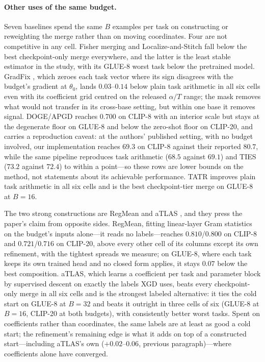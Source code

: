 \documentclass{article} %
\newcommand{\thetab}{\theta_0}
\begin{document}
\paragraph{Other uses of the same budget.}
Seven baselines spend the same $B$ examples per task on constructing or reweighting the merge rather than on moving coordinates. Four are not competitive in any cell. Fisher merging and Localize-and-Stitch fall below the best checkpoint-only merge everywhere, and the latter is the least stable estimator in the study, with its GLUE-8 worst task below the pretrained model. GradFix \citep{rinaldi2025gradfix}, which zeroes each task vector where its sign disagrees with the budget's gradient at $\thetab$, lands $0.03$--$0.14$ below plain task arithmetic in all six cells even with its coefficient grid centred on the released $\alpha/T$ range; the mask removes what would not transfer in its cross-base setting, but within one base it removes signal. DOGE/APGD \citep{wei2025apgd} reaches $0.700$ on CLIP-8 with an interior scale but stays at the degenerate floor on GLUE-8 and below the zero-shot floor on CLIP-20, and carries a reproduction caveat: at the authors' published setting, with no budget involved, our implementation reaches $69.3$ on CLIP-8 against their reported $80.7$, while the same pipeline reproduces task arithmetic ($68.5$ against $69.1$) and TIES ($73.2$ against $72.4$) to within a point---so these rows are lower bounds on the method, not statements about its achievable performance. TATR \citep{sun2025tatr} improves plain task arithmetic in all six cells and is the best checkpoint-tier merge on GLUE-8 at $B=16$.

The two strong constructions are RegMean and aTLAS \citep{zhang2024atlas}, and they press the paper's claim from opposite sides. RegMean, fitting linear-layer Gram statistics on the budget's inputs alone---it reads no labels---reaches $0.810$/$0.800$ on CLIP-8 and $0.721$/$0.716$ on CLIP-20, above every other cell of its columns except its own refinement, with the tightest spreads we measure; on GLUE-8, where each task keeps its own trained head and no closed form applies, it stays $0.07$ below the best composition. aTLAS, which learns a coefficient per task and parameter block by supervised descent on exactly the labels XGD uses, beats every checkpoint-only merge in all six cells and is the strongest labeled alternative: it ties the cold start on GLUE-8 at $B=32$ and beats it outright in three cells of six (GLUE-8 at $B=16$, CLIP-20 at both budgets), with consistently better worst tasks. Spent on coefficients rather than coordinates, the same labels are at least as good a cold start; the refinement's remaining edge is what it adds on top of a constructed start---including aTLAS's own (${+}0.02$--$0.06$, previous paragraph)---where coefficients alone have converged.
\end{document}
